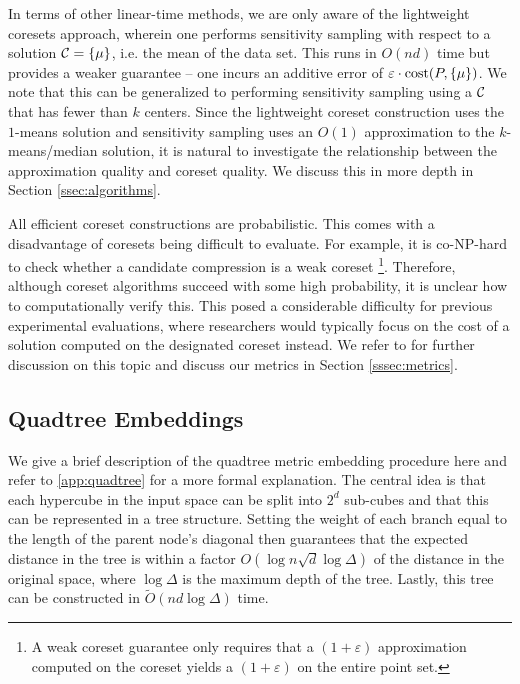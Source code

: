 In terms of other linear-time methods, we are only aware of the lightweight coresets approach\cite{BachemL018}, wherein one performs sensitivity
sampling with respect to a solution $\mathcal C=\{\mu\}$, i.e. the mean of the data set. This runs in $O(nd)$ time but provides a weaker guarantee -- one incurs an
additive error of $\varepsilon\cdot \operatorname{cost}(P,\{\mu\})$.  We note that this can be generalized to performing sensitivity sampling using a $\mathcal C$ that has fewer
than $k$ centers. Since the lightweight coreset construction uses the $1$-means solution and sensitivity sampling uses an $O(1)$ approximation to the
$k$-means/median solution, it is natural to investigate the relationship between the approximation quality and coreset quality. We discuss this in more depth in
Section \ref{ssec:algorithms}.

All efficient coreset constructions are probabilistic. This comes with a disadvantage of coresets being difficult to evaluate. For example, it is
co-NP-hard to check whether a candidate compression is a weak coreset \cite{chrisESA} \footnote{A weak coreset guarantee only requires that a $(1+\varepsilon)$
approximation computed on the coreset yields a $(1+\varepsilon)$ on the entire point set.}. Therefore, although coreset algorithms succeed with some high
probability, it is unclear how to computationally verify this.  This posed a considerable difficulty for previous experimental evaluations,
where researchers would typically focus on the cost of a solution computed on the designated coreset instead. We refer to \cite{chrisESA} for further discussion
on this topic and discuss our metrics in Section \ref{sssec:metrics}.


\subsection{Quadtree Embeddings}

We give a brief description of the quadtree metric embedding procedure here and refer to \cref{app:quadtree} for a more formal explanation.  The central idea is
that each hypercube in the input space can be split into $2^d$ sub-cubes and that this can be represented in a tree structure. Setting the weight of each branch
equal to the length of the parent node's diagonal then guarantees that the expected distance in the tree is within a factor $O(\log n \sqrt{d} \log
\Delta)$ of the distance in the original space,
where $\log \Delta$ is the maximum depth of the tree. Lastly, this tree can be constructed in $\tilde{O}(nd \log \Delta)$ time.
